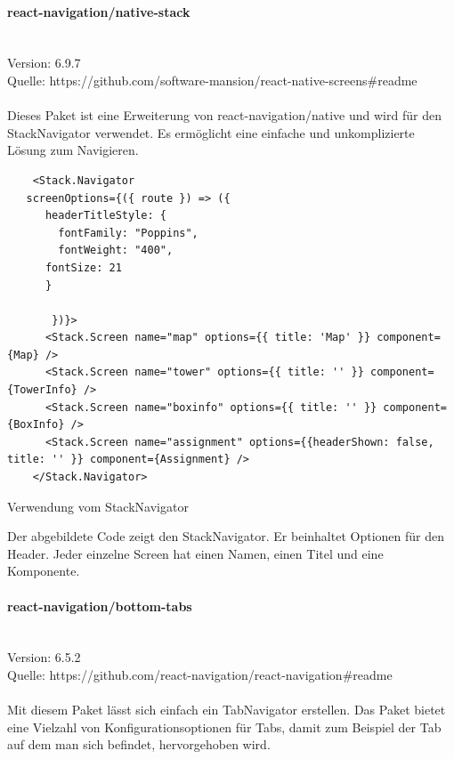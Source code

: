 \paragraph{react-navigation/native-stack}\mbox{}\\
Version: 6.9.7\\
Quelle: https://github.com/software-mansion/react-native-screens\#readme\\ \\
Dieses Paket ist eine Erweiterung von react-navigation/native und wird für den StackNavigator verwendet. Es ermöglicht eine einfache und unkomplizierte Lösung zum Navigieren.
\begin{listing}[H]
\begin{verbatim}
    <Stack.Navigator
   screenOptions={({ route }) => ({ 
      headerTitleStyle: {
        fontFamily: "Poppins",
        fontWeight: "400",
      fontSize: 21
      }  
      
       })}>
      <Stack.Screen name="map" options={{ title: 'Map' }} component={Map} />
      <Stack.Screen name="tower" options={{ title: '' }} component={TowerInfo} />
      <Stack.Screen name="boxinfo" options={{ title: '' }} component={BoxInfo} />
      <Stack.Screen name="assignment" options={{headerShown: false, title: '' }} component={Assignment} />
    </Stack.Navigator>
\end{verbatim}
\caption{Verwendung vom StackNavigator}
  \label{lst:stacknavigator}
\end{listing}
Der abgebildete Code zeigt den StackNavigator. Er beinhaltet Optionen für den Header. Jeder einzelne Screen hat einen Namen, einen Titel und eine Komponente.\\


\paragraph{react-navigation/bottom-tabs}\mbox{}\\
Version: 6.5.2\\
Quelle: https://github.com/react-navigation/react-navigation\#readme\\ \\
Mit diesem Paket lässt sich einfach ein TabNavigator erstellen. Das Paket bietet eine Vielzahl von Konfigurationsoptionen für Tabs, damit zum Beispiel der Tab auf dem man sich befindet, hervorgehoben wird.\\

